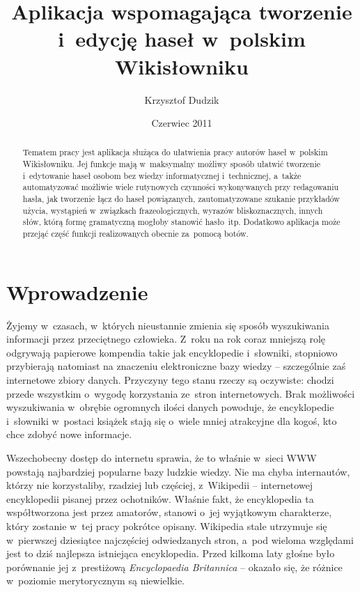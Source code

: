 \documentclass{pracamgr}
\author{Krzysztof Dudzik}
\title{Aplikacja wspomagająca tworzenie i~edycję haseł w~polskim Wikisłowniku}
\date{Czerwiec 2011}
\begin{document}
\maketitle

\begin{abstract}
  Tematem pracy jest aplikacja służąca do ułatwienia pracy autorów haseł w~polskim Wikisłowniku. Jej funkcje mają w~maksymalny możliwy sposób ułatwić tworzenie i~edytowanie haseł osobom bez wiedzy informatycznej i~technicznej, a~także automatyzować możliwie wiele rutynowych czynności wykonywanych przy redagowaniu hasła, jak tworzenie łącz do haseł powiązanych, zautomatyzowane szukanie przykładów użycia, wystąpień w~związkach frazeologicznych, wyrazów bliskoznacznych, innych słów, którą formę gramatyczną mogłoby stanowić hasło~itp. Dodatkowo aplikacja może przejąć część funkcji realizowanych obecnie za~pomocą botów.
\end{abstract}

\tableofcontents

\chapter{Wprowadzenie}
Żyjemy w~czasach, w~których nieustannie zmienia się sposób wyszukiwania informacji przez przeciętnego człowieka. Z~roku na rok coraz mniejszą rolę odgrywają papierowe kompendia takie jak encyklopedie i~słowniki, stopniowo przybierają natomiast na znaczeniu elektroniczne bazy wiedzy -- szczególnie zaś internetowe zbiory danych. Przyczyny tego stanu rzeczy są oczywiste: chodzi przede wszystkim o~wygodę korzystania ze~stron internetowych. Brak możliwości wyszukiwania w~obrębie ogromnych ilości danych powoduje, że encyklopedie i~słowniki w~postaci książek stają się o~wiele mniej atrakcyjne dla kogoś, kto chce zdobyć nowe informacje.

Wszechobecny dostęp do internetu sprawia, że to właśnie w~sieci WWW powstają najbardziej popularne bazy ludzkie wiedzy. Nie ma chyba internautów, którzy nie korzystaliby, rzadziej lub częściej, z~Wikipedii -- internetowej encyklopedii pisanej przez ochotników. Właśnie fakt, że encyklopedia ta współtworzona jest przez amatorów, stanowi o~jej wyjątkowym charakterze, który zostanie w~tej pracy pokrótce opisany. Wikipedia stale utrzymuje się w~pierwszej dziesiątce najczęściej odwiedzanych stron, a~pod wieloma względami jest to dziś najlepsza istniejąca encyklopedia. Przed kilkoma laty głośne było porównanie jej z~prestiżową \emph{Encyclopaedia Britannica} -- okazało się, że różnice w~poziomie merytorycznym są niewielkie.
\end{document}
